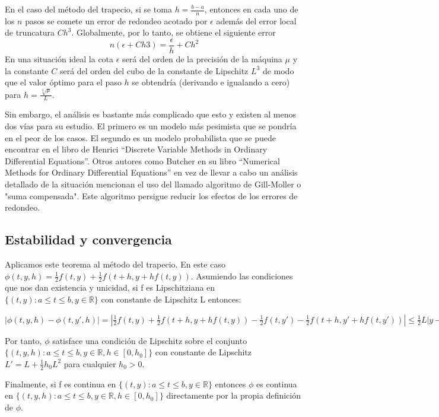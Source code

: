\documentclass{article}
\theoremstyle{theorem-style}  %
\theoremstyle{definition-style}
\theoremstyle{example-style}
\begin{document}
		En el caso del método del trapecio, si se toma $h=\frac{b-a}{n}$, entonces en cada uno de los $n$ pasos se comete un error de redondeo acotado por $\epsilon$ además del error local de truncatura $Ch^{3}$. Globalmente, por lo tanto, se obtiene el siguiente error 
		$$ n(\epsilon+Ch{3})=\frac{\epsilon}{h}+Ch^{2} $$
		En una situación ideal la cota $\epsilon$ será del orden de la precisión de la máquina $\mu$ y la constante $C$ será del orden del cubo de la constante de Lipschitz $L^3$ de modo que el valor óptimo para el paso $h$ se obtendría (derivando e igualando a cero) para $h=\frac{\sqrt[3]\mu}{L}$.
		
		Sin embargo, el análisis es bastante más complicado que esto y existen al menos dos vías para su estudio. El primero es un modelo más pesimista que se pondría en el peor de los casos. El segundo es un modelo probabilista que se puede encontrar en el libro de Henrici ``Discrete Variable Methods in Ordinary Differential Equations''. Otros autores como Butcher en su libro ``Numerical Methods for Ordinary Differential Equations'' en vez de llevar a cabo un análisis detallado de la situación mencionan el uso del llamado algoritmo de Gill-Moller o "suma compensada". Este algoritmo persigue reducir los efectos de los errores de redondeo.

\subsection{Estabilidad y convergencia} \label{sec:trapecio-explicito:estabilidad}

	Aplicamos este teorema al método del trapecio. En este caso $\phi(t,y,h)=\frac{1}{2}f(t,y)+\frac{1}{2}f(t+h,y+hf(t,y))$. Asumiendo las condiciones que nos dan existencia y unicidad, si f es Lipschitziana en 
	$\{(t,y):a \leq t \leq b, y \in \mathbb{R}\}$ 
	con constante de Lipschitz L entonces:
	
	$|\phi(t,y,h)-\phi(t,y',h)|=|\frac{1}{2}f(t,y)+\frac{1}{2}f(t+h,y+hf(t,y))-\frac{1}{2}f(t,y')-\frac{1}{2}f(t+h,y'+hf(t,y'))| \leq \frac{1}{2}L|y-y'|+\frac{1}{2}L|y+hf(t,y)-y'-hf(t,y')| \leq L |y-y'|+\frac{1}{2}L|hf(t,y)-hf(t,y')|=(L+\frac{1}{2}hL^{2})|y-y'|$ 
	
	Por tanto, $\phi$ satisface una condición de Lipschitz sobre el conjunto 
	$\{(t,y,h):a \leq t \leq b, y \in \mathbb{R}, h \in [0,h_0]\}$ 
	con constante de Lipschitz 
	$L'=L+\frac{1}{2} h_0 L^{2}$ 
	para cualquier $h_0 > 0$. 
	
	Finalmente, si f es continua en 
	$\{(t,y):a \leq t \leq b, y \in \mathbb{R}\}$ 
	entonces $\phi$ es continua en 
	$\{(t,y,h):a \leq t \leq b, y \in \mathbb{R}, h \in [0,h_0]\}$ 
	directamente por la propia definición de $\phi$. 
	
\end{document}
